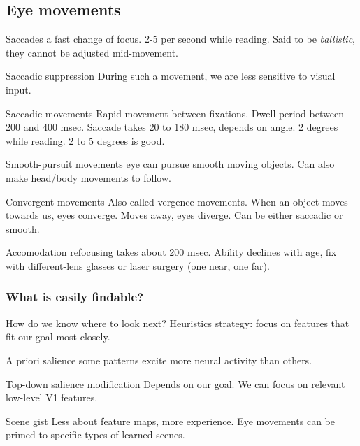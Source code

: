 \begin{mdframed}\begin{multicols}{2}
\subsection{Eye movements}
\begin{compactdesc}
    \item[Saccades] a fast change of focus. 2-5 per second while reading.
        Said to be \emph{ballistic}, they cannot be adjusted mid-movement.
    \item[Saccadic suppression] During such a movement, we are less sensitive
        to visual input.
    \item[Saccadic movements] Rapid movement between fixations.
        Dwell period between 200 and 400 msec.
        Saccade takes 20 to 180 msec, depends on angle. 2 degrees while
        reading. 2 to 5 degrees is good.
    \item[Smooth-pursuit movements] eye can pursue smooth moving objects. Can
        also make head/body movements to follow.
    \item[Convergent movements] Also called vergence movements. When an object moves
        towards us, eyes converge. Moves away, eyes diverge. Can be either
        saccadic or smooth.
    \item[Accomodation] refocusing takes about 200 msec. Ability declines with
        age, fix with different-lens glasses or laser surgery (one near, one
        far).
\end{compactdesc}

\subsubsection{What is easily findable?}
How do we know where to look next? Heuristics strategy: focus on features that
fit our goal most closely.
\begin{compactdesc}
    \item[A priori salience] some patterns excite more neural activity than
        others.
    \item[Top-down salience modification] Depends on our goal. We can focus on
        relevant low-level V1 features.
    \item[Scene gist] Less about feature maps, more experience. Eye movements
        can be primed to specific types of learned scenes.
\end{compactdesc}
\end{multicols}\end{mdframed}



